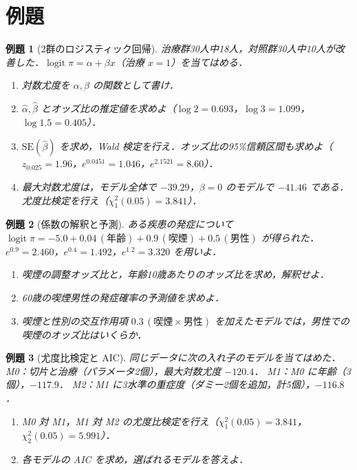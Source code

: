 \documentclass[a4paper,11pt,openany]{ltjsbook}
\newtheorem{reidai}{例題}[chapter]
\newcommand{\SE}{\mathrm{SE}}
\newcommand{\logit}{\operatorname{logit}}
\begin{document}
\section{例題}\label{sec:06-ex}
\begin{reidai}[2群のロジスティック回帰]\label{reidai:06-1}
治療群30人中18人，対照群30人中10人が改善した．$\logit\pi=\alpha+\beta x$（治療 $x=1$）を当てはめる．
\begin{enumerate}[label=(\arabic*)]
\item 対数尤度を $\alpha,\beta$ の関数として書け．
\item $\hat\alpha,\hat\beta$ とオッズ比の推定値を求めよ（$\log2=0.693$，$\log3=1.099$，$\log1.5=0.405$）．
\item $\SE(\hat\beta)$ を求め，Wald 検定を行え．オッズ比の95\%信頼区間も求めよ（$z_{0.025}=1.96$，$e^{0.0451}=1.046$，$e^{2.1521}=8.60$）．
\item 最大対数尤度は，モデル全体で $-39.29$，$\beta=0$ のモデルで $-41.46$ である．尤度比検定を行え（$\chi^2_1(0.05)=3.841$）．
\end{enumerate}
\end{reidai}

\begin{reidai}[係数の解釈と予測]\label{reidai:06-2}
ある疾患の発症について $\logit\pi=-5.0+0.04\,(\text{年齢})+0.9\,(\text{喫煙})+0.5\,(\text{男性})$ が得られた．
$e^{0.9}=2.460$，$e^{0.4}=1.492$，$e^{1.2}=3.320$ を用いよ．
\begin{enumerate}[label=(\arabic*)]
\item 喫煙の調整オッズ比と，年齢10歳あたりのオッズ比を求め，解釈せよ．
\item 60歳の喫煙男性の発症確率の予測値を求めよ．
\item 喫煙と性別の交互作用項 $0.3\,(\text{喫煙}\times\text{男性})$ を加えたモデルでは，男性での喫煙のオッズ比はいくらか．
\end{enumerate}
\end{reidai}

\begin{reidai}[尤度比検定と AIC]\label{reidai:06-3}
同じデータに次の入れ子のモデルを当てはめた．
M0：切片と治療（パラメータ2個），最大対数尤度 $-120.4$．
M1：M0 に年齢（3個），$-117.9$．
M2：M1 に3水準の重症度（ダミー2個を追加，計5個），$-116.8$．
\begin{enumerate}[label=(\arabic*)]
\item M0 対 M1，M1 対 M2 の尤度比検定を行え（$\chi^2_1(0.05)=3.841$，$\chi^2_2(0.05)=5.991$）．
\item 各モデルの AIC を求め，選ばれるモデルを答えよ．
\end{enumerate}
\end{reidai}
\end{document}
